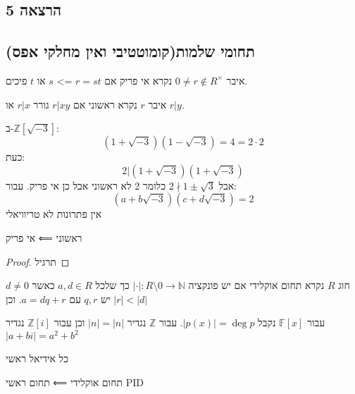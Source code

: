 \documentclass{tstextbook}
\begin{document}
\subsection{הרצאה 5}

\subsection{תחומי שלמות(קומוטטיבי ואין מחלקי אפס)}

\begin{definition}[אי פריק]
איבר \(0\neq r \not\in R^{\times}\) נקרא אי פריק אם \(r=st\) => \(s\) או \(t\) פיכים.

\end{definition}
\begin{definition}[ראשוני]
איבר \(r\) נקרא ראשוני אם \(r|xy\) גורר \(r|x\) או \(r|y\).

\end{definition}
\begin{example}
ב-\(\mathbb{Z}[\sqrt{ -3 }]\):
$$(1+\sqrt{ -3 })(1-\sqrt{ -3 })=4=2\cdot 2$$
כעת:
$$2|(1+\sqrt{ -3 })(1+\sqrt{ -3 })$$
אבל \(2\nmid 1\pm \sqrt{ 3 }\) כלומר 2 לא ראשוני אבל כן אי פריק. עבור:
$$(a+b\sqrt{ -3 })(c+d\sqrt{ -3 })=2$$
אין פתרונות לא טריוויאלי

\end{example}
\begin{proposition}
ראשוני ⟸ אי פריק

\end{proposition}
\begin{proof}
תרגיל

\end{proof}
\begin{definition}
חוג \(R\) נקרא תחום אוקלידי אם יש פונקציה \(\lvert \cdot \rvert:R\setminus 0 \to \mathbb{N}\) כך שלכל \(a,d \in R\) כאשר \(d\neq 0\) יש \(q,r\) עם \(a=dq+r\). וכן \(\lvert r \rvert<\lvert d \rvert\)

\end{definition}
\begin{example}
עבור \(\mathbb{F}[x]\) נקבל \(\lvert p(x) \rvert=\deg p\). עבור \(\mathbb{Z}\) נגדיר \(\lvert n \rvert=\lvert n \rvert\) וכן עבור \(\mathbb{Z}[i]\) נגדיר \(\lvert a+bi \rvert=a^{2}+b^{2}\)

\end{example}
\begin{definition}
כל אידיאל ראשי

\end{definition}
\begin{proposition}
תחום אוקלידי ⟸ תחום ראשי PID

\end{proposition}
\end{document}
